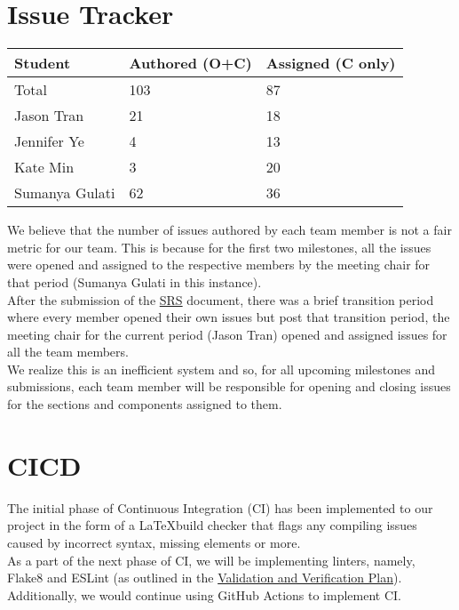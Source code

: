 \documentclass{article}
\begin{document}
\section{Issue Tracker} \label{section:issue_tracker}

\begin{table}[H]
\centering
\begin{tabular}{lll}
\toprule
\textbf{Student} & \textbf{Authored (O+C)} & \textbf{Assigned (C only)}\\
\midrule
Total & 103 & 87 \\
Jason Tran & 21 & 18 \\
Jennifer Ye & 4 & 13 \\
Kate Min & 3 & 20 \\
Sumanya Gulati & 62 & 36 \\
\bottomrule
\end{tabular}
\end{table}

We believe that the number of issues authored by each team member is not a fair
metric for our team. This is because for the first two milestones, all the issues
were opened and assigned to the respective members by the meeting chair for that
period (Sumanya Gulati in this instance).\\
\newline
After the submission of the \href{https://github.com/SumanyaG/Alkalytics/blob/main/docs/SRS/SRS.pdf}{SRS}
document, there was a brief transition period where every member opened their own issues
but post that transition period, the meeting chair for the current period (Jason Tran)
opened and assigned issues for all the team members.\\
\newline
We realize this is an inefficient system and so, for all upcoming milestones and
submissions, each team member will be responsible for opening and closing issues
for the sections and components assigned to them.

\section{CICD}

The initial phase of Continuous Integration (CI) has been implemented to our
project in the form of a \LaTeX build checker that flags any compiling issues
caused by incorrect syntax, missing elements or more.\\
\newline
As a part of the next phase of CI, we will be implementing linters, namely,
Flake8 and ESLint (as outlined in the 
\href{https://github.com/SumanyaG/Alkalytics/blob/main/docs/VnVPlan/VnVPlan.pdf}{Validation and Verification Plan}).
Additionally, we would continue using GitHub Actions to implement CI.
\end{document}
